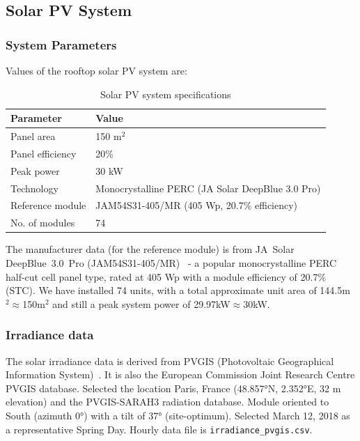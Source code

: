 \subsection{Solar PV System}
\label{subsec:solar_system}

\subsubsection{System Parameters}

Values of the rooftop solar PV system are:

\begin{table}[H]
\centering
\caption{Solar PV system specifications}
\label{tab:pv_specs}
\begin{tabular}{@{}ll@{}}
\toprule
\textbf{Parameter} & \textbf{Value} \\
\midrule
Panel area & 150 m$^2$ \\
Panel efficiency & 20\% \\
Peak power & 30 kW \\
Technology & Monocrystalline PERC (JA Solar DeepBlue 3.0 Pro) \\
Reference module & JAM54S31-405/MR (405 Wp, 20.7\% efficiency) \\
No. of modules & 74 \\
\bottomrule
\end{tabular}
\end{table}

The manufacturer data (for the reference module) is from JA~Solar DeepBlue~3.0~Pro (JAM54S31-405/MR)~\cite{ja_solar_deepblue} - a popular monocrystalline PERC half-cut cell panel type, rated at 405 Wp with a module efficiency of 20.7\% (STC). We have installed 74 units, with a total approximate unit area of 144.5m$^2\approx$150m$^2$ and still a peak system power of 29.97kW$\approx$30kW.

\subsubsection{Irradiance data}

The solar irradiance data is derived from PVGIS (Photovoltaic Geographical Information System)~\cite{pvgis}. It is also the European Commission Joint Research Centre PVGIS database. Selected the location Paris, France (48.857°N, 2.352°E, 32 m elevation) and the PVGIS-SARAH3 radiation database. Module oriented to South (azimuth 0°) with a tilt of 37° (site-optimum). Selected March 12, 2018 as a representative Spring Day. Hourly data file is \texttt{irradiance\_pvgis.csv}.

